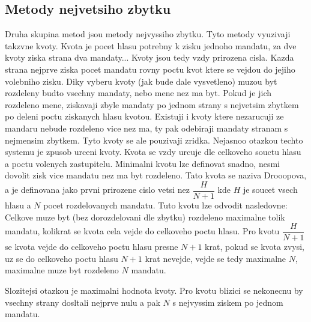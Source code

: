 \documentclass[12pt,a4paper]{article}
\begin{document}
\subsection{Metody nejvetsiho zbytku}
Druha skupina metod jsou metody nejvyssiho zbytku.
Tyto metody vyuzivaji takzvne kvoty.
Kvota je pocet hlasu potrebny k zisku jednoho mandatu, za dve kvoty ziska strana dva mandaty...
Kvoty jsou tedy vzdy prirozena cisla.
Kazda strana nejprve ziska pocet mandatu rovny poctu kvot ktere se vejdou do jejiho volebniho zisku.
Diky vyberu kvoty (jak bude dale vysvetleno) muzou byt rozdeleny budto vsechny mandaty, nebo mene nez ma byt.
Pokud je jich rozdeleno mene, ziskavaji zbyle mandaty po jednom strany s nejvetsim zbytkem po deleni poctu ziskanych hlasu kvotou.
Existuji i kvoty ktere nezarucuji ze mandaru nebude rozdeleno vice nez ma, ty pak odebiraji mandaty stranam s nejmensim zbytkem.
Tyto kvoty se ale pouzivaji zridka.
Nejasnoo otazkou techto systemu je zpusob urceni kvoty.
Kvota se vzdy urcuje dle celkoveho souctu hlasu a poctu volenych zastupitelu.
Minimalni kvotu lze definovat snadno, nesmi dovolit zisk vice mandatu nez ma byt rozdeleno.
Tato kvota se naziva Drooopova, a je definovana jako prvni prirozene cislo vetsi nez $\dfrac{H}{N+1}$ kde $H$ je soucet vsech hlasu a $N$ pocet rozdelovanych mandatu.
Tuto kvotu lze odvodit nasledovne: Celkove muze byt (bez dorozdelovani dle zbytku) rozdeleno maximalne tolik mandatu, kolikrat se kvota cela vejde do celkoveho poctu hlasu.
Pro kvotu $\dfrac{H}{N+1}$ se kvota vejde do celkoveho poctu hlasu presne $N+1$ krat, pokud se kvota zvysi, uz se do celkoveho poctu hlasu $N+1$ krat nevejde, vejde se tedy maximalne $N$, maximalne muze byt rozdeleno $N$ mandatu.

Slozitejsi otazkou je maximalni hodnota kvoty.
Pro kvotu blizici se nekonecnu by vsechny strany dosltali nejprve nulu a pak $N$ s nejvyssim ziskem po jednom mandatu.
\end{document}
